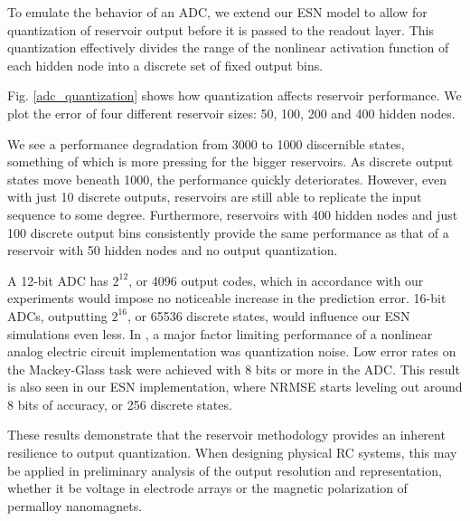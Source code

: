 
To emulate the behavior of an ADC, we extend our ESN model to allow for
quantization of reservoir output before it is passed to the readout layer. This
quantization effectively divides the range of the nonlinear activation function
of each hidden node into a discrete set of fixed output bins.

Fig. \ref{adc_quantization} shows how quantization affects reservoir
performance. We plot the error of four different reservoir sizes: 50, 100, 200
and 400 hidden nodes.

We see a performance degradation from 3000 to 1000 discernible states, something
of which is more pressing for the bigger reservoirs. As discrete output states
move beneath 1000, the performance quickly deteriorates. However, even with just
10 discrete outputs, reservoirs are still able to replicate the input sequence
to some degree. Furthermore, reservoirs with 400 hidden nodes and just 100
discrete output bins consistently provide the same performance as that of a
reservoir with 50 hidden nodes and no output quantization.

A 12-bit ADC has $2^{12}$, or 4096 output codes, which in accordance with our
experiments would impose no noticeable increase in the prediction error. 16-bit
ADCs, outputting $2^{16}$, or 65536 discrete states, would influence our ESN
simulations even less. In \cite{soriano_delay-based_2015}, a major factor
limiting performance of a nonlinear analog electric circuit implementation was
quantization noise. Low error rates on the Mackey-Glass task were achieved with
8 bits or more in the ADC. This result is also seen in our ESN implementation,
where NRMSE starts leveling out around 8 bits of accuracy, or 256 discrete
states.

These results demonstrate that the reservoir methodology provides an inherent
resilience to output quantization. When designing physical RC systems, this may
be applied in preliminary analysis of the output resolution and representation,
whether it be voltage in electrode arrays or the magnetic polarization of
permalloy nanomagnets.



